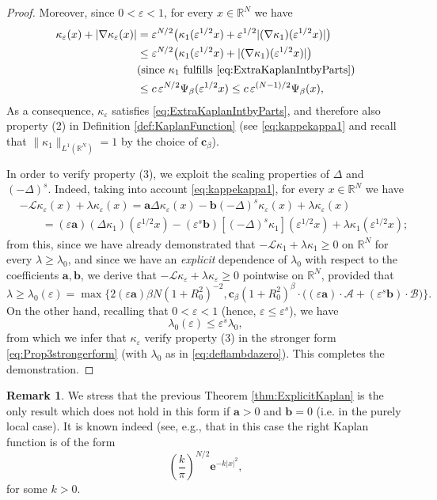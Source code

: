 \documentclass[11pt,a4paper,reqno]{amsart}
\def \RN {\mathbb{R}^N}
\def \R {\mathbb{R}}
\def \e {\varepsilon}
\def \LL {\mathcal{L}}
\theoremstyle{definition}
\newtheorem{remark}[definition]{Remark}
\theoremstyle{plain}
\numberwithin{equation}{section}
\begin{document}
\begin{proof}
Moreover, since $0<\varepsilon<1$, for every $x\in\mathbb{R}^N$ we have
\begin{align*} \kappa_\e(x)+|\nabla \kappa_\e(x)| & = \e^{N/2}\big(\kappa_1(\e^{1/2}x)+\e^{1/2}|(\nabla \kappa_1)(\e^{1/2}x)|\big) \\ & \leq \e^{N/2}\big(\kappa_1(\e^{1/2}x)+|(\nabla \kappa_1)(\e^{1/2}x)|\big) \\ & (\text{since $\kappa_1$ fulfills \eqref{eq:ExtraKaplanIntbyParts}}) \\ & \leq c\,\e^{N/2}\Psi_\beta(\e^{1/2}x) \leq c\,\e^{(N-1)/2}\Psi_\beta(x), \end{align*}As a consequence, $\kappa_\varepsilon$ satisfies \eqref{eq:ExtraKaplanIntbyParts}, and therefore also property (2) in Definition \ref{def:KaplanFunction} (see \eqref{eq:kappekappa1} and recall that $\|\kappa_1\|_{L^1(\mathbb{R}^N)}=1$ by the choice of $\mathbf{c}_\beta$).

In order to verify property (3), we exploit the scaling properties of $\Delta$ and $(-\Delta)^s$. Indeed, taking into account \eqref{eq:kappekappa1},
 for every $x\in\RN$ we have
\begin{align*}
	& -\LL\kappa_\e(x)+\lambda\kappa_\e(x) = \mathbf{a}\Delta\kappa_\e(x)-
	\mathbf{b}(-\Delta)^s\kappa_\e(x)+\lambda\kappa_\e(x) \\
	& \qquad = (\e\mathbf{a})(\Delta\kappa_1)(\e^{1/2}x)-(\e^{s}\mathbf{b})[(-\Delta)^s\kappa_1](\e^{1/2}x)+\lambda\kappa_1(\e^{1/2}x);
\end{align*}
from this, since we have already demonstrated that $-\LL\kappa_1+\lambda\kappa_1\geq 0$ on $\RN$ for every $\lambda\geq \lambda_0$, and since we have an \emph{explicit} dependence of $\lambda_0$ with respect to the coefficients
$\mathbf{a},\mathbf{b}$, we derive that
$-\LL\kappa_\e+\lambda\kappa_\e\geq 0$ pointwise on $\R^N$, provided that
$$\lambda\geq \lambda_0(\e) = \max\big\{2(\e \mathbf{a})\beta N(1+R_0^2)^{-2},\mathbf{c}_\beta(1+R_0^2)^\beta\cdot\big((\e \mathbf{a})\cdot\mathcal{A}+(\e^s\mathbf{b})\cdot\mathcal{B}\big)\big\}.$$
On the other hand, recalling that $0<\e < 1$ (hence, $\e\leq \e^s$), we have
$$\lambda_0(\e)\leq \e^s\lambda_0,$$
from which we infer that $\kappa_\e$ verify property (3) in the stronger form
\eqref{eq:Prop3strongerform} (with $\lambda_0$ as in \eqref{eq:deflambdazero}). This completes the demonstration.
\end{proof}
\begin{remark}
	We stress that the previous Theorem \ref{thm:ExplicitKaplan} is the only result which does not hold in this form if $\mathbf{a}>0$ and $\mathbf{b}=0$ (i.e. in the purely local case). It is known indeed (see, e.g., \cite{BL, deP} that in this case the right Kaplan function is of the form 
	\begin{equation*}
		\left(\dfrac{k}{\pi}\right)^{N/2} \mathbf{e}^{-k|x|^2},
	\end{equation*}
	\noindent for some $k>0$.
\end{remark}	
\end{document}
